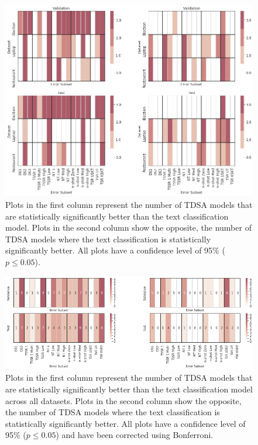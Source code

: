 \begin{figure}[ht!]
    \centering
    \includegraphics[scale=0.4]{images/augmentation/methods_performance/baseline/baseline_dataset_error_subset_heatmap.png}
    \caption{Plots in the first column represent the number of TDSA models that are statistically significantly better than the text classification model. Plots in the second column show the opposite, the number of TDSA models where the text classification is statistically significantly better. All plots have a confidence level of 95\% ($p \leq 0.05$).}
    \label{fig:aug_baseline_dataset_error_subset_heatmap}
\end{figure}

\begin{figure}[ht!]
    \centering
    \includegraphics[scale=0.4]{images/augmentation/methods_performance/baseline/baseline_combined_dataset_error_subset_heatmap.png}
    \caption{Plots in the first column represent the number of TDSA models that are statistically significantly better than the text classification model across all datasets. Plots in the second column show the opposite, the number of TDSA models where the text classification is statistically significantly better. All plots have a confidence level of 95\% ($p \leq 0.05$) and have been corrected using Bonferroni.}
    \label{fig:aug_baseline_combined_dataset_error_subset_heatmap}
\end{figure}

